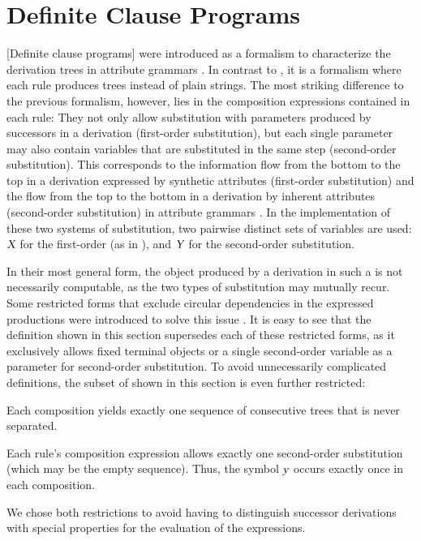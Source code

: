 \documentclass[../../document.tex]{subfiles}
\begin{document}
    \section{Definite Clause Programs}\label{sec:grammar:dcp}
    [Definite clause programs]  were introduced as a formalism to characterize the derivation trees in attribute grammars \citep{Der85}.
    In contrast to , it is a formalism where each rule produces trees instead of plain strings.
    The most striking difference to the previous formalism, however, lies in the composition expressions contained in each rule:
    They not only allow substitution with parameters produced by successors in a derivation (first-order substitution), but each single parameter may also contain variables that are substituted in the same step (second-order substitution).
    This corresponds to the information flow from the bottom to the top in a derivation expressed by synthetic attributes (first-order substitution) and the flow from the top to the bottom in a derivation by inherent attributes (second-order substitution) in attribute grammars \citep[cf.\@][Section~1]{Der88}.
    In the implementation of these two systems of substitution, two pairwise distinct sets of variables are used: \(\textsl{X}\) for the first-order (as in ), and \(\textsl{Y}\) for the second-order substitution.

    In their most general form, the object produced by a derivation in such a  is not necessarily computable, as the two types of substitution may mutually recur.
    Some restricted forms that exclude circular dependencies in the expressed productions were introduced to solve this issue \citep[Section~3.4 discusses non-circular attribute grammars]{Cou82}.
    It is easy to see that the definition shown in this section supersedes each of these restricted forms, as it exclusively allows fixed terminal objects or a single second-order variable as a parameter for second-order substitution.
    To avoid unnecessarily complicated definitions, the subset of  shown in this section is even further restricted:
    \begin{inparaenum}
        \item Each composition yields exactly one sequence of consecutive trees that is never separated.
        \item Each rule's composition expression allows exactly one second-order substitution (which may be the empty sequence). Thus, the symbol \(\textsl{y}\) occurs exactly once in each composition.
    \end{inparaenum}
    We chose both restrictions to avoid having to distinguish successor derivations with special properties for the evaluation of the expressions.
\end{document}
